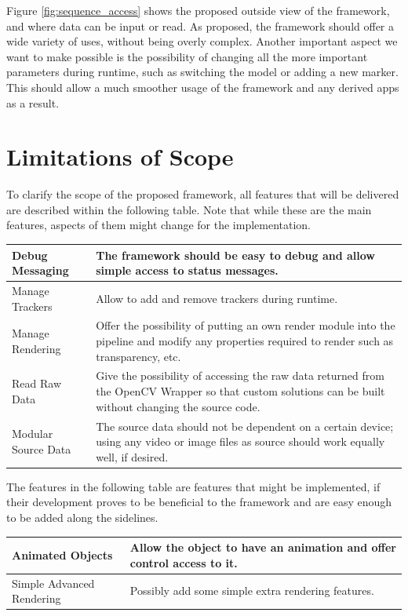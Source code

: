 Figure \ref{fig:sequence_access} shows the proposed outside view of the framework, and where data can be input or read.
As proposed, the framework should offer a wide variety of uses, without being overly complex.
Another important aspect we want to make possible is the possibility of changing all the more important parameters during runtime, such as switching the model or adding a new marker.
This should allow a much smoother usage of the framework and any derived apps as a result.

\section{Limitations of Scope}

To clarify the scope of the proposed framework, all features that will be delivered are described within the following table.
Note that while these are the main features, aspects of them might change for the implementation.

\begin{tabulary}{\textwidth}{L || L}
Debug Messaging & The framework should be easy to debug and allow simple access to status messages.\\
\hline
Manage Trackers & Allow to add and remove trackers during runtime.\\
\hline
Manage Rendering & Offer the possibility of putting an own render module into the pipeline and modify any properties required to render such as transparency, etc.\\
\hline
Read Raw Data & Give the possibility of accessing the raw data returned from the OpenCV Wrapper so that custom solutions can be built without changing the source code.\\
\hline
Modular Source Data & The source data should not be dependent on a certain device; using any video or image files as source should work equally well, if desired.
\end{tabulary}

The features in the following table are features that might be implemented, if their development proves to be beneficial to the framework and are easy enough to be added along the sidelines.

\begin{tabulary}{\textwidth}{L || L}
Animated Objects & Allow the object to have an animation and offer control access to it.\\
\hline
Simple Advanced Rendering & Possibly add some simple extra rendering features.\\
\end{tabulary}

